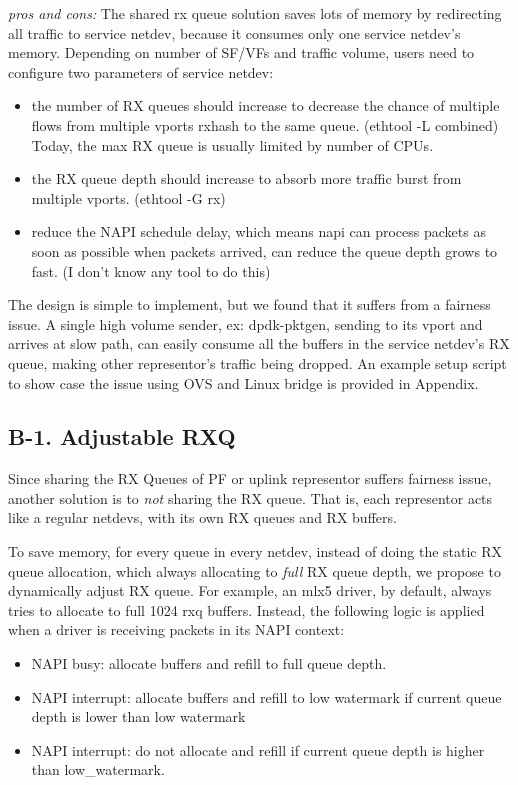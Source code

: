 \documentclass[letterpaper]{article}
\begin{document}
\emph{pros and cons:}
The shared rx queue solution saves lots of memory by redirecting
all traffic to service netdev, because it consumes only one service
netdev's memory. Depending on number of SF/VFs and traffic volume,
users need to configure two parameters of service netdev:
\begin{itemize}
    \item the number of RX queues should increase to decrease the chance
    of multiple flows from multiple vports rxhash to the same queue.
    (ethtool -L combined) Today, the max RX queue is usually limited by
    number of CPUs.
    \item the RX queue depth should increase to absorb more traffic
    burst from multiple vports. (ethtool -G rx)
    \item reduce the NAPI schedule delay, which means napi can process
    packets as soon as possible when packets arrived, can reduce the queue
    depth grows to fast. (I don't know any tool to do this)
\end{itemize}

The design is simple to implement, but we found that it suffers from
a fairness issue. A single high volume sender, ex: dpdk-pktgen,
sending to its vport and arrives at slow path, can easily consume all
the buffers in the service netdev's RX queue, making other representor's
traffic being dropped. An example setup script to show case the issue
using OVS and Linux bridge is provided in Appendix.

\subsection{B-1. Adjustable RXQ}
Since sharing the RX Queues of PF or uplink representor suffers fairness
issue, another solution is to {\em not} sharing the RX queue. That is, each
representor acts like a regular netdevs, with its own RX queues and RX buffers.

To save memory, for every queue in every netdev, instead of doing the
static RX queue allocation, which always allocating to \emph{full} RX queue
depth, we propose to dynamically adjust RX queue.
For example, an mlx5 driver, by default, always tries to allocate to
full 1024 rxq buffers. Instead, the following logic is applied when
a driver is receiving packets in its NAPI context:
\begin{itemize}
    \item NAPI busy: allocate buffers and refill to full queue depth.
    \item NAPI interrupt: allocate buffers and refill to low watermark if
    current queue depth is lower than low watermark
    \item NAPI interrupt: do not allocate and refill if current queue
    depth is higher than low\_watermark.
\end{itemize}
\end{document}
